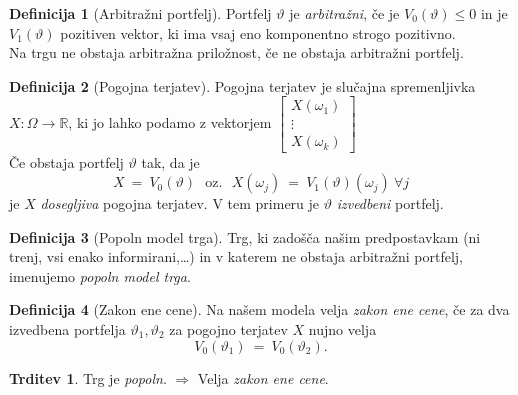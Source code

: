 \documentclass[11pt]{article}
\newcommand{\R}{\mathbb{R}}
\theoremstyle{definition}
\newtheorem{definicija}{Definicija}[section]
\theoremstyle{definition}
\newtheorem{trditev}{Trditev}[section]
\begin{document}
\begin{definicija}[Arbitražni portfelj]

Portfelj $\vartheta$ je \textit{arbitražni}, če je $V_0(\vartheta) \leq 0$ in je $V_1(\vartheta)$ pozitiven vektor, ki ima vsaj eno komponentno strogo pozitivno.\\

\noindent Na trgu ne obstaja arbitražna priložnost, če ne obstaja arbitražni portfelj.

\end{definicija}
\vspace{0.5cm}

\begin{definicija}[Pogojna terjatev]

Pogojna terjatev je slučajna spremenljivka $X: \Omega \rightarrow \R$, ki jo lahko podamo z vektorjem $\begin{bmatrix}
X(\omega_1) \\
\vdots \\
X(\omega_k)
\end{bmatrix}$ \\

\noindent Če obstaja portfelj $\vartheta$ tak, da je
$$X ~=~ V_0(\vartheta) ~~~\text{oz.}~~~ X(\omega_j) ~=~ V_1(\vartheta)(\omega_j) ~\forall j$$
je $X$ \textit{dosegljiva} pogojna terjatev. V tem primeru je $\vartheta$ \textit{izvedbeni} portfelj.

\end{definicija}
\vspace{0.5cm}

\begin{definicija}[Popoln model trga]

Trg, ki zadošča našim predpostavkam (ni trenj, vsi enako informirani,\ldots) in v katerem ne obstaja arbitražni portfelj, imenujemo \textit{popoln model trga}. 

\end{definicija}
\vspace{0.5cm}

\begin{definicija}[Zakon ene cene]

Na našem modela velja \textit{zakon ene cene}, če za dva izvedbena portfelja $\vartheta_1, \vartheta_2$ za pogojno terjatev $X$ nujno velja
$$V_0(\vartheta_1) ~=~ V_0(\vartheta_2).$$

\end{definicija}
\vspace{0.5cm}

\begin{trditev}

Trg je \textit{popoln}. $\Longrightarrow$ Velja \textit{zakon ene cene}.

\end{trditev}
\vspace{0.5cm}
\end{document}
